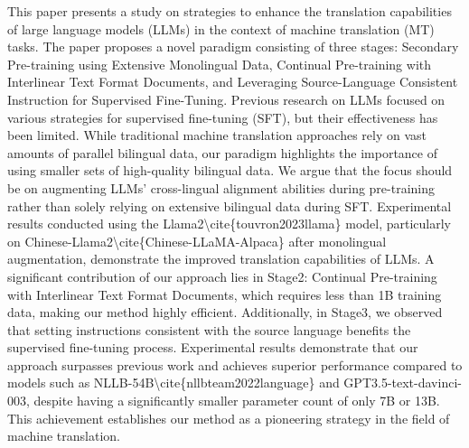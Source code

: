 This paper presents a study on strategies to enhance the translation capabilities of large language models (LLMs) in the context of machine translation (MT) tasks. The paper proposes a novel paradigm consisting of three stages: Secondary Pre-training using Extensive Monolingual Data, Continual Pre-training with Interlinear Text Format Documents, and Leveraging Source-Language Consistent Instruction for Supervised Fine-Tuning. Previous research on LLMs focused on various strategies for supervised fine-tuning (SFT), but their effectiveness has been limited. While traditional machine translation approaches rely on vast amounts of parallel bilingual data, our paradigm highlights the importance of using smaller sets of high-quality bilingual data. We argue that the focus should be on augmenting LLMs' cross-lingual alignment abilities during pre-training rather than solely relying on extensive bilingual data during SFT. Experimental results conducted using the Llama2\textbackslash{}cite\{touvron2023llama\} model, particularly on Chinese-Llama2\textbackslash{}cite\{Chinese-LLaMA-Alpaca\} after monolingual augmentation, demonstrate the improved translation capabilities of LLMs. A significant contribution of our approach lies in Stage2: Continual Pre-training with Interlinear Text Format Documents, which requires less than 1B training data, making our method highly efficient. Additionally, in Stage3, we observed that setting instructions consistent with the source language benefits the supervised fine-tuning process. Experimental results demonstrate that our approach surpasses previous work and achieves superior performance compared to models such as NLLB-54B\textbackslash{}cite\{nllbteam2022language\} and GPT3.5-text-davinci-003, despite having a significantly smaller parameter count of only 7B or 13B. This achievement establishes our method as a pioneering strategy in the field of machine translation.